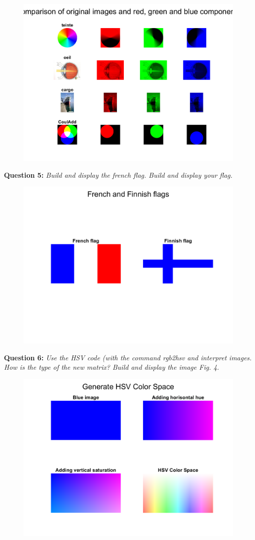 \begin{figure}[H]
    \centering
    \includegraphics[width=\linewidth]{Doc/Graphics/Part1/Part1_Question4a.png}
    \label{fig:enter-label}
\end{figure}



\textbf{Question 5:}
\textit{Build and display the french ﬂag. Build and display your ﬂag.}

\begin{figure}[H]
    \centering
    \includegraphics[width=0.5\linewidth]{Doc/Graphics/Part1/Part1_Question5.png}
    \label{fig:enter-label}
\end{figure}


\newpage
\textbf{Question 6:}
\textit{Use the HSV code (with the command rgb2hsv and interpret images. How is the type of the new matrix? Build and display the image Fig. 4.}

\begin{figure}[H]
    \centering
    \includegraphics[width=0.75\linewidth]{Doc/Graphics/Part1/Part1_Question6a.png}
    \label{fig:enter-label}
\end{figure}

